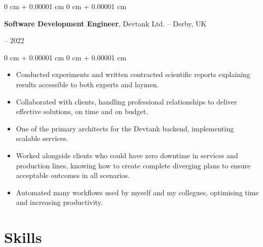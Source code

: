 \documentclass[10pt, letterpaper]{article}
\newenvironment{highlights}{
    \begin{itemize}[
        topsep=0.10 cm,
        parsep=0.10 cm,
        partopsep=0pt,
        itemsep=0pt,
        leftmargin=0 cm + 10pt
    ]
}{
    \end{itemize}
}
\newenvironment{onecolentry}{
    \begin{adjustwidth}{
        0 cm + 0.00001 cm
    }{
        0 cm + 0.00001 cm
    }
}{
    \end{adjustwidth}
}
\newenvironment{twocolentry}[2][]{
    \onecolentry
    \def\secondColumn{#2}
    \setcolumnwidth{\fill, 4.5 cm}
    \begin{paracol}{2}
}{
    \switchcolumn \raggedleft \secondColumn
    \end{paracol}
    \endonecolentry
}
\begin{document}
        \vspace{0.2 cm}

        \begin{twocolentry}{
            2020 – 2022
        }
            \textbf{Software Development Engineer}, Devtank Ltd. -- Derby, UK
        \end{twocolentry}

        \vspace{0.10 cm}
        \begin{onecolentry}
            \begin{highlights}
                \item Conducted experiments and written contracted scientific reports explaining results accessible to both experts and laymen.
                \item Collaborated with clients, handling professional relationships to deliver effective solutions, on time and on budget.
                \item One of the primary architects for the Devtank backend, implementing scalable services.
                \item Worked alongside clients who could have zero downtime in services and production lines, knowing how to create complete diverging plans to ensure acceptable outcomes in all scenarios.
                \item Automated many workflows used by myself and my collegues, optimising time and increasing productivity.
            \end{highlights}
        \end{onecolentry}
    
    \section{Skills}
\end{document}

